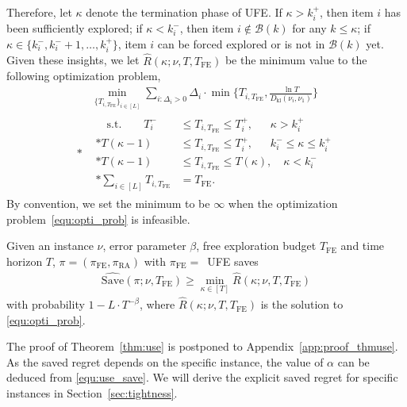 \documentclass[twoside,11pt]{article}
\newcommand{\kl}{D_{\mathrm{kl}}}
\newcommand{\calB}{\mathcal{B}}
\newcommand{\Tfe}{T_{\mathrm{FE}}}
\newcommand{\Saved}{\mathrm{Save}}
\newcommand{\FE}{\textrm{FE}}
\newcommand{\RA}{\textrm{RA}}
\newcommand{\ouralgfe}{\textsc{UFE}}
\begin{document}
Therefore, let $\kappa$ denote the termination phase of \ouralgfe{}. 
If $\kappa>k_i^+$, then item $i$ has been sufficiently explored; 
if $\kappa<k_i^-$, then item $i\notin\calB(k)$ for any $k\leq\kappa$; 
if $\kappa\in \{k_i^-,k_i^-+1,\ldots, k_i^+\}$, item $i$ can be forced explored or is not in $\calB(k)$ yet.
Given these insights, we let $\hat{R}(\kappa;\nu,T,\Tfe)$ be the minimum value to the following optimization problem,
\begin{align}
    &\min_{ \{ T_{i,\Tfe}\}_{i\in[L]}} \sum_{i:\Delta_i>0} \Delta_i\cdot \min\Big\{ T_{i,\Tfe}, \frac{\ln T}{\kl(\nu_i,\nu_1)} \Big\}
    \\*
    &
    \begin{aligned}
      \quad \mbox{s.t.} \qquad  
        T_i^- &\leq T_{i,\Tfe} \leq T_i^+,\quad\;\; \kappa > k_i^+ 
    \\*
        T(\kappa-1) &\leq T_{i,\Tfe} \leq T_i^+,\quad\;\; k_i^-\leq \kappa\leq k_i^+
    \\*
         T(\kappa-1)& \leq T_{i,\Tfe}\leq T(\kappa),\quad  \kappa < k_i^-
    \\*
        \sum_{i\in[L]} T_{i,\Tfe} &=\Tfe.
    \end{aligned}\label{equ:opti_prob}
\end{align}
By convention, we set the minimum to be $\infty$ when the optimization problem~\eqref{equ:opti_prob} is infeasible. 
\begin{theorem}\label{thm:use}
    Given an instance $\nu$, error parameter $\beta$, free exploration budget $\Tfe$ and time horizon $T$, $\pi=(\pi_{\FE},\pi_{\RA})$ with $\pi_{\FE}=$\ \ouralgfe{} saves 
    \begin{align}\label{equ:use_save}
        \widehat{\Saved}(\pi;\nu,\Tfe)\geq\min_{\kappa\in[T]} \hat{R}(\kappa;\nu,T,\Tfe)
    \end{align}
    with probability $1-L\cdot T^{-\beta}$, where $\hat{R}(\kappa;\nu,T,\Tfe)$ is the solution to \eqref{equ:opti_prob}.
\end{theorem}
The proof of Theorem~\ref{thm:use} is postponed to Appendix~\ref{app:proof_thmuse}.
As the saved regret depends on the specific instance, the value of $\alpha$ can be deduced from \eqref{equ:use_save}. We will derive the explicit saved regret for specific instances in Section~\ref{sec:tightness}.
\end{document}
